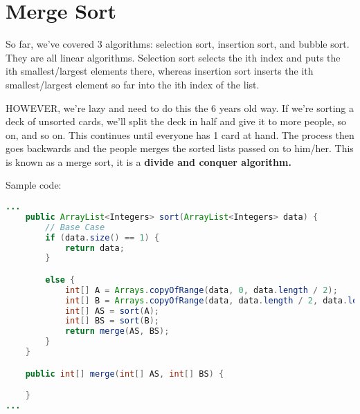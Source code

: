 \documentclass [12 pt, twoside] {article}
\begin{document}
\section{Merge Sort}

So far, we've covered 3 algorithms: selection sort, insertion sort, and bubble sort.
They are all linear algorithms. Selection sort selects the ith index and puts the ith
smallest/largest elements there, whereas insertion sort inserts the ith smallest/largest
element so far into the ith index of the list.

HOWEVER, we're lazy and need to do this the 6 years old way. If we're sorting a deck of
unsorted cards, we'll split the deck in half and give it to more people, so on, and so
on. This continues until everyone has 1 card at hand. The process then goes backwards
and the people merges the sorted lists passed on to him/her. This is known as a merge sort,
it is a \textbf{divide and conquer algorithm.}

Sample code:
\begin{lstlisting}[language=java]
...
	public ArrayList<Integers> sort(ArrayList<Integers> data) {
		// Base Case
		if (data.size() == 1) {
			return data;
		}

		else {
			int[] A = Arrays.copyOfRange(data, 0, data.length / 2);
			int[] B = Arrays.copyOfRange(data, data.length / 2, data.length);
			int[] AS = sort(A);
			int[] BS = sort(B);
			return merge(AS, BS);
		}
	}

	public int[] merge(int[] AS, int[] BS) {

	}
...
\end{lstlisting}
\end{document}
